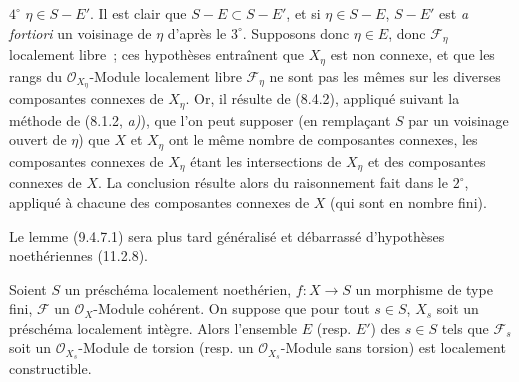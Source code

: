 $4^\circ$ $\eta\in S-E'$. Il est clair que $S-E\subset S-E'$, et si
$\eta\in S-E$, $S-E'$ est \emph{a fortiori} un voisinage de $\eta$ d'après le
$3^\circ$. Supposons donc $\eta\in E$, donc $\mathcal F_\eta$ localement
libre~; ces hypothèses entraînent que $X_\eta$ est non connexe, et que les
rangs du $\mathcal O_{X_\eta}$-Module localement libre $\mathcal F_\eta$ ne
sont pas les mêmes sur les diverses composantes connexes de $X_\eta$. Or, il
résulte de (8.4.2), appliqué suivant la méthode de (8.1.2, \emph{a)}), que l'on
peut supposer (en remplaçant $S$ par un voisinage ouvert de $\eta$) que $X$ et
$X_\eta$ ont le même nombre de composantes connexes, les composantes connexes
de $X_\eta$ étant les intersections de $X_\eta$ et des composantes connexes de
$X$. La conclusion résulte alors du raisonnement fait dans le $2^\circ$,
appliqué à chacune des composantes connexes de $X$ (qui sont en nombre fini).

\begin{remark}[9.4.7.2]
\label{IV.9.4.7.2-fr}
Le lemme (9.4.7.1) sera plus tard généralisé et débarrassé d'hypothèses
noethériennes (11.2.8).
\end{remark}

\begin{proposition}[9.4.8]
\label{IV.9.4.8-fr}
Soient $S$ un préschéma localement noethérien, $f:X\to S$ un morphisme de type
fini, $\mathcal F$ un $\mathcal O_X$-Module cohérent. On suppose que pour tout
$s\in S$, $X_s$ soit un préschéma localement intègre. Alors l'ensemble $E$
\textnormal{(}resp. $E'$\textnormal{)} des $s\in S$ tels que $\mathcal F_s$
soit un $\mathcal O_{X_s}$-Module de torsion \textnormal{(}resp. un
$\mathcal O_{X_s}$-Module sans torsion\textnormal{)} est localement
constructible.
\end{proposition}

